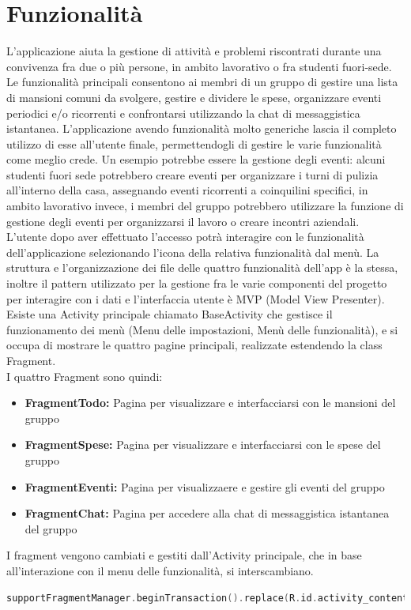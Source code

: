 \section{Funzionalità}
L'applicazione aiuta la gestione di attività e problemi riscontrati durante una convivenza fra due o più persone, in ambito lavorativo o fra studenti fuori-sede.\\
Le funzionalità principali consentono ai membri di un gruppo di gestire una lista di mansioni comuni da svolgere, gestire e dividere le spese, organizzare eventi periodici e/o ricorrenti e confrontarsi utilizzando la chat di messaggistica istantanea.
L'applicazione avendo funzionalità molto generiche lascia il completo utilizzo di esse all'utente finale, permettendogli di gestire le varie funzionalità come meglio crede. Un esempio potrebbe essere la gestione degli eventi: alcuni studenti fuori sede potrebbero creare eventi per organizzare i turni di pulizia all'interno della casa, assegnando eventi ricorrenti a coinquilini specifici, in ambito lavorativo invece, i membri del gruppo potrebbero utilizzare la funzione di gestione degli eventi per organizzarsi il lavoro o creare incontri aziendali.\\
L'utente dopo aver effettuato l'accesso potrà interagire con le funzionalità dell'applicazione selezionando l'icona della relativa funzionalità dal menù.
La struttura e l'organizzazione dei file delle quattro funzionalità dell'app è la stessa, inoltre il pattern utilizzato per la gestione fra le varie componenti del progetto per interagire con i dati e l'interfaccia utente è MVP (Model View Presenter).\\
Esiste una Activity principale chiamato BaseActivity che gestisce il funzionamento dei menù (Menu delle impostazioni, Menù delle funzionalità), e si occupa di mostrare le quattro pagine principali, realizzate estendendo la class Fragment.\\
I quattro Fragment sono quindi:
\begin{itemize}
    \item \textbf{FragmentTodo:} Pagina per visualizzare e interfacciarsi con le mansioni del gruppo
    \item \textbf{FragmentSpese:} Pagina per visualizzare e interfacciarsi con le spese del gruppo
    \item \textbf{FragmentEventi:} Pagina per visualizzaere e gestire gli eventi del gruppo
    \item \textbf{FragmentChat:} Pagina per accedere alla chat di messaggistica istantanea del gruppo
\end{itemize}
I fragment vengono cambiati e gestiti dall'Activity principale, che in base all'interazione con il menu delle funzionalità, si interscambiano.
\begin{lstlisting}[language=kotlin,caption={Aggiornamento fragment del BaseActivity}]
 supportFragmentManager.beginTransaction().replace(R.id.activity_content, TodoFragment()).commit()
\end{lstlisting}

